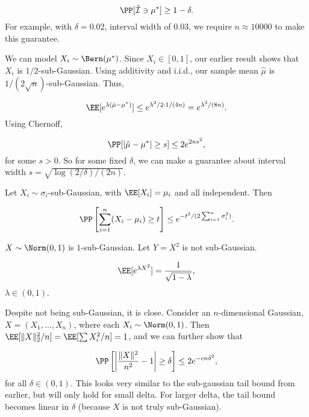 \[\PP[\hat{\mathcal{I}}\ni \mu^{*}] \geq 1-\delta.\] 
For example, with $\delta=0.02$, interval width of $0.03$, we require $n\approx 10000$ to make this guarantee.  

We can model $X_i\sim \Bern(\mu^*)$. Since $X_i\in [0,1]$, our earlier result shows that $X_i$ is $1/2$-sub-Gaussian. Using additivity and i.i.d., our sample mean $\hat{\mu}$ is $1/(2\sqrt{n})$-sub-Gaussian. Thus, 

\[\EE[e^{\lambda(\hat{\mu}-\mu^*)}] \leq e^{\lambda^2/2\cdot 1/(4n)} = e^{\lambda^2/(8n)}.\]
Using Chernoff,

\[\PP[\vert \hat{\mu}-\mu^*\vert \geq s] \leq 2e^{2ns^2},\] 
for some $s > 0$. So for some fixed $\delta$, we can make a guarantee about interval width $s = \sqrt{\log(2/\delta) / (2n)}$. 

\begin{theorem}

Let $X_i\sim \sigma_i$-sub-Gaussian, with $\EE[X_i]=\mu_i$ and all independent. Then

\[\PP\left[\sum_{i=1}^n (X_i-\mu_i)\geq t\right] \leq e^{-t^2 / (2\sum_{i=1}^n\sigma_i^2)}.\] 
\end{theorem}

\begin{example}
\exlabel

$X\sim \Norm(0,1)$ is $1$-sub-Gaussian. Let $Y=X^2$ is not sub-Gaussian. 
\end{example}

\begin{align*}
	\EE[e^{\lambda X^2}] = \frac{1}{\sqrt{1-\lambda}},
\end{align*}
$\lambda\in (0,1)$.

Despite not being sub-Gaussian, it is close. Consider an $n$-dimensional Gaussian, $X = (X_1, \hdots, X_n)$, where each $X_i\sim \Norm(0,1)$. Then $\EE[\lVert X\rVert_2^2 / n] = \EE[\sum X_i^2 / n] = 1$, and we can further show that 

\[\PP\left[ \left\vert\frac{\lVert X\rVert^2}{n^2} - 1\right\vert \geq \delta\right] \leq 2e^{-cn\delta^2},\] 
for all $\delta\in (0,1)$. This looks very similar to the sub-gaussian tail bound from earlier, but will only hold for small delta. For larger delta, the tail bound becomes linear in $\delta$ (because $X$ is not truly sub-Gaussian).


